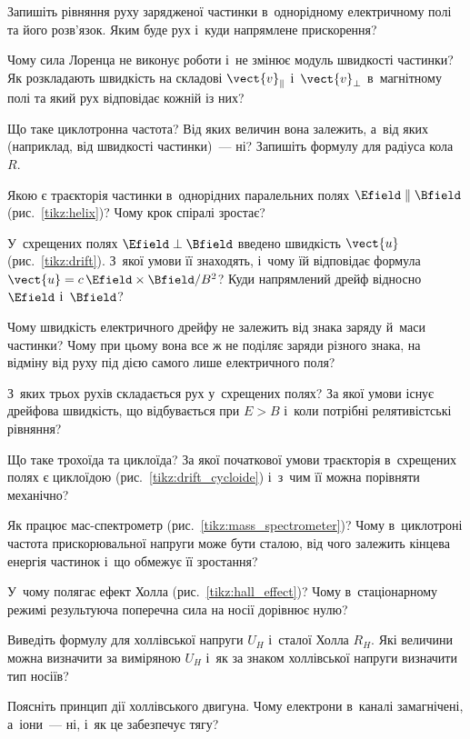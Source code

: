 \begin{Questions}
\begin{quizlist}
	\item Запишіть рівняння руху зарядженої частинки в~однорідному електричному полі та його розв'язок. Яким буде рух і~куди напрямлене прискорення?
	\item Чому сила Лоренца не виконує роботи і~не змінює модуль швидкості частинки? Як розкладають швидкість на складові $\vect{v}_{\parallel}$ і~$\vect{v}_{\perp}$ в~магнітному полі та який рух відповідає кожній із них?
	\item Що таке циклотронна частота? Від яких величин вона залежить, а~від яких (наприклад, від швидкості частинки)~--- ні? Запишіть формулу для радіуса кола $R$.
	\item Якою є траєкторія частинки в~однорідних паралельних полях $\Efield \parallel \Bfield$ (рис.~\ref{tikz:helix})? Чому крок спіралі зростає?
	\item У~схрещених полях $\Efield \perp \Bfield$ введено швидкість $\vect{u}$ (рис.~\ref{tikz:drift}). З~якої умови її знаходять, і~чому їй відповідає формула $\vect{u} = c\,\Efield\times\Bfield/B^2$? Куди напрямлений дрейф відносно $\Efield$ і~$\Bfield$?
	\item Чому швидкість електричного дрейфу не залежить від знака заряду й~маси частинки? Чому при цьому вона все ж не поділяє заряди різного знака, на відміну від руху під дією самого лише електричного поля?
	\item З~яких трьох рухів складається рух у~схрещених полях? За якої умови існує дрейфова швидкість, що відбувається при $E > B$ і~коли потрібні релятивістські рівняння?
	\item Що таке трохоїда та циклоїда? За якої початкової умови траєкторія в~схрещених полях є циклоїдою (рис.~\ref{tikz:drift_cycloide}) і~з~чим її можна порівняти механічно?
	\item Як працює мас-спектрометр (рис.~\ref{tikz:mass_spectrometer})? Чому в~циклотроні частота прискорювальної напруги може бути сталою, від чого залежить кінцева енергія частинок і~що обмежує її зростання?
	\item У~чому полягає ефект Холла (рис.~\ref{tikz:hall_effect})? Чому в~стаціонарному режимі результуюча поперечна сила на носії дорівнює нулю?
	\item Виведіть формулу для холлівської напруги $U_H$ і~сталої Холла $R_H$. Які величини можна визначити за виміряною $U_H$ і~як за знаком холлівської напруги визначити тип носіїв?
	\item Поясніть принцип дії холлівського двигуна. Чому електрони в~каналі замагнічені, а~іони~--- ні, і~як це забезпечує тягу?

\end{quizlist}
\end{Questions}
